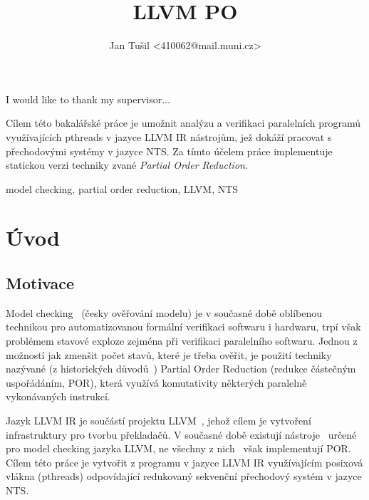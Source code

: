 \documentclass[12pt]{fithesis2}
\author{Jan Tušil <410062@mail.muni.cz>}
\title{LLVM PO}
\begin{document}
\FrontMatter
\ThesisTitlePage
\begin{ThesisDeclaration}
\DeclarationText
\AdvisorName
\end{ThesisDeclaration}

\begin{ThesisThanks}
I would like to thank my supervisor...
\end{ThesisThanks}

\begin{ThesisAbstract}
Cílem této bakalářské práce je umožnit analýzu a verifikaci paralelních programů využívajících pthreads v jazyce LLVM IR nástrojům, jež dokáží pracovat s přechodovými systémy v jazyce NTS. Za tímto účelem práce implementuje statickou verzi techniky zvané \textit{Partial Order Reduction}.
\end{ThesisAbstract}
\begin{ThesisKeyWords}
model checking, partial order reduction, LLVM, NTS
\end{ThesisKeyWords}
\MainMatter

\tableofcontents

\chapter{Úvod}
\section{Motivace}
Model checking~\cite{CLARKE} (česky ověřování modelu) je v současné době oblíbenou technikou pro automatizovanou formální verifikaci softwaru i hardwaru, trpí však problémem stavové exploze zejména při verifikaci paralelního softwaru. Jednou z možností jak zmenšit počet stavů, které je třeba ověřit, je použití techniky nazývané (z historických důvodů~\cite{CLARKE}) Partial Order Reduction (redukce částečným uspořádáním, POR), která využívá komutativity některých paralelně vykonávaných instrukcí.

Jazyk LLVM IR je součástí projektu LLVM~\cite{LLVM}, jehož cílem je vytvoření infrastruktury pro tvorbu překladačů. V současné době existují nástroje~\cite{LLBMC} určené pro model checking jazyka LLVM, ne všechny z nich~\cite{BBH+13} však implementují POR. Cílem této práce je vytvořit z programu v jazyce LLVM IR využívajícím posixová vlákna (pthreads) odpovídající redukovaný sekvenční přechodový systém v jazyce NTS.
\end{document}
